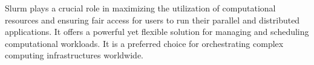 
Slurm plays a crucial role in maximizing the utilization of computational resources and ensuring fair access for users to run their parallel and distributed applications. It offers a powerful yet flexible solution for managing and scheduling computational workloads. It is a preferred choice for orchestrating complex computing infrastructures worldwide. 



